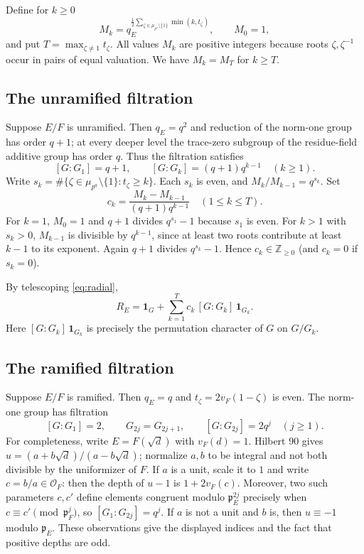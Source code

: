 \documentclass[11pt]{article}
\theoremstyle{plain}
\theoremstyle{definition}
\begin{document}
Define for $k\geq0$
\[
 M_k=q_E^{\frac12\sum_{\zeta\in\mu_{p^a}\setminus\{1\}}\min(k,t_\zeta)},\qquad M_0=1,
\]
and put $T=\max_{\zeta\ne1}t_\zeta$. All values $M_k$ are positive integers because roots $\zeta,\zeta^{-1}$ occur in pairs of equal valuation. We have $M_k=M_T$ for $k\geq T$.

\subsection{The unramified filtration}
Suppose $E/F$ is unramified. Then $q_E=q^2$ and reduction of the norm-one group has order $q+1$; at every deeper level the trace-zero subgroup of the residue-field additive group has order $q$. Thus the filtration satisfies
\[
 [G:G_1]=q+1,\qquad [G:G_k]=(q+1)q^{k-1}\quad(k\geq1).
\]
Write $s_k=\#\{\zeta\in\mu_{p^a}\setminus\{1\}:t_\zeta\geq k\}$. Each $s_k$ is even, and $M_k/M_{k-1}=q^{s_k}$.
Set
\[
 c_k=\frac{M_k-M_{k-1}}{(q+1)q^{k-1}}\quad(1\leq k\leq T).
\]
For $k=1$, $M_0=1$ and $q+1$ divides $q^{s_1}-1$ because $s_1$ is even. For $k>1$ with $s_k>0$, $M_{k-1}$ is divisible by $q^{k-1}$, since at least two roots contribute at least $k-1$ to its exponent. Again $q+1$ divides $q^{s_k}-1$. Hence $c_k\in\mathbb Z_{\geq0}$ (and $c_k=0$ if $s_k=0$).

By telescoping \eqref{eq:radial},
\begin{equation}\label{eq:unram}
 \boxed{R_E=\mathbf1_G+\sum_{k=1}^T c_k\,[G:G_k]\,\mathbf1_{G_k}.}
\end{equation}
Here $[G:G_k]\,\mathbf1_{G_k}$ is precisely the permutation character of $G$ on $G/G_k$.

\subsection{The ramified filtration}
Suppose $E/F$ is ramified. Then $q_E=q$ and $t_\zeta=2v_F(1-\zeta)$ is even. The norm-one group has filtration
\[
 [G:G_1]=2,\qquad G_{2j}=G_{2j+1},\qquad [G:G_{2j}]=2q^j\quad(j\geq1).
\]
For completeness, write $E=F(\sqrt d)$ with $v_F(d)=1$. Hilbert 90 gives $u=(a+b\sqrt d)/(a-b\sqrt d)$; normalize $a,b$ to be integral and not both divisible by the uniformizer of $F$. If $a$ is a unit, scale it to $1$ and write $c=b/a\in\mathcal O_F$: then the depth of $u-1$ is $1+2v_F(c)$. Moreover, two such parameters $c,c'$ define elements congruent modulo $\mathfrak p_E^{2j}$ precisely when $c\equiv c'\pmod{\mathfrak p_F^j}$, so $[G_1:G_{2j}]=q^j$. If $a$ is not a unit and $b$ is, then $u\equiv-1$ modulo $\mathfrak p_E$. These observations give the displayed indices and the fact that positive depths are odd.
\end{document}
